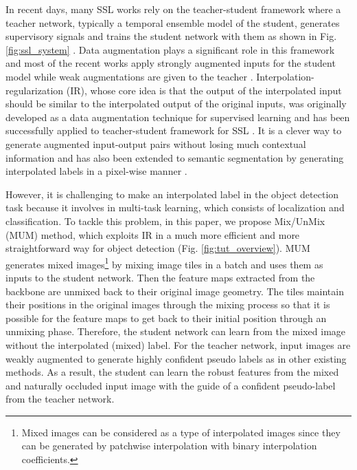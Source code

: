 \documentclass[10pt,twocolumn,letterpaper]{article}
\begin{document}
In recent days, many SSL works rely on the teacher-student framework where a teacher network, typically a temporal ensemble model of the student, generates supervisory signals and trains the student network with them as shown in Fig. \ref{fig:ssl_system} \cite{laine2016temporal, tarvainen2017mean}.
Data augmentation plays a significant role in this framework and most of the recent works apply strongly augmented inputs for the student model while weak augmentations are given to the teacher \cite{verma2019interpolation, sohn2020fixmatch}. 
Interpolation-regularization (IR), whose core idea is that the output of the interpolated input should be similar to the interpolated output of the original inputs, was originally developed as a data augmentation technique for supervised learning \cite{zhang2017mixup} and has been successfully applied to teacher-student framework for SSL \cite{verma2019interpolation, berthelot2019mixmatch}. It is a clever way to generate augmented input-output pairs without losing much contextual information and has also been extended to semantic segmentation by generating interpolated labels in a pixel-wise manner \cite{french2019semi,kim2020structured}.

However, it is challenging to make an interpolated label in the object detection task because it involves in multi-task learning, which consists of localization and classification.   
To tackle this problem, in this paper, we propose Mix/UnMix (MUM) method, which exploits IR in a much more efficient and more straightforward way for object detection (Fig. \ref{fig:tut_overview}).
MUM generates mixed images\footnote{Mixed images can be considered as a type of interpolated images since they can be generated by patchwise interpolation with binary interpolation coefficients.} by mixing image tiles in a batch and uses them as inputs to the student network.
Then the feature maps extracted from the backbone are unmixed back to their original image geometry.
The tiles maintain their positions in the original images through the mixing process so that it is possible for the feature maps to get back to their initial position through an unmixing phase.
Therefore, the student network can learn from the mixed image without the interpolated (mixed) label.
For the teacher network, input images are weakly augmented to generate highly confident pseudo labels as in other existing methods.
As a result, the student can learn the robust features from the mixed and naturally occluded input image with the guide of a confident pseudo-label from the teacher network. 
\end{document}
